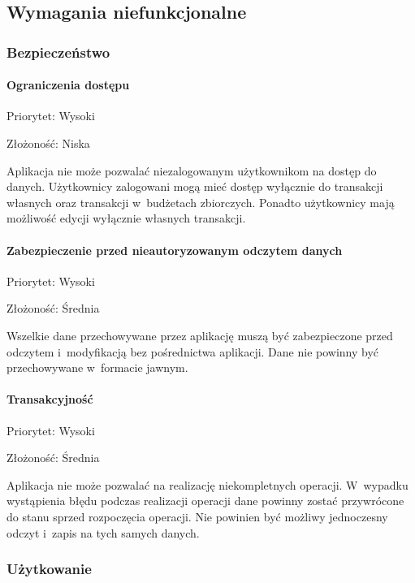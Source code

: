 \newpage
\subsection{Wymagania niefunkcjonalne}

\subsubsection{Bezpieczeństwo}

\paragraph{Ograniczenia dostępu\newline}
Priorytet: Wysoki

Złożoność: Niska

Aplikacja nie może pozwalać niezalogowanym użytkownikom na dostęp do danych. Użytkownicy zalogowani mogą mieć dostęp wyłącznie do transakcji własnych oraz transakcji w~budżetach zbiorczych. Ponadto użytkownicy mają możliwość edycji wyłącznie własnych transakcji.

\paragraph{Zabezpieczenie przed nieautoryzowanym odczytem danych\newline}
Priorytet: Wysoki

Złożoność: Średnia

Wszelkie dane przechowywane przez aplikację muszą być zabezpieczone przed odczytem i~modyfikacją bez pośrednictwa aplikacji. Dane nie powinny być przechowywane w~formacie jawnym.

\paragraph{Transakcyjność\newline}
Priorytet: Wysoki

Złożoność: Średnia

Aplikacja nie może pozwalać na realizację niekompletnych operacji. W~wypadku wystąpienia błędu podczas realizacji operacji dane powinny zostać przywrócone do stanu sprzed rozpoczęcia operacji. Nie powinien być możliwy jednoczesny odczyt i~zapis na tych samych danych.

\subsubsection{Użytkowanie}

